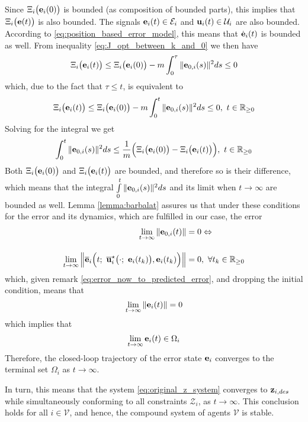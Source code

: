 Since $\Xi_i\big(\bm{\mathbf{e}}_i(0)\big)$
is bounded (as composition of bounded parts), this implies
that $\Xi_i\big(\bm{\mathbf{e}}(t)\big)$ is also bounded. The signals
$\bm{\mathbf{e}}_i(t) \in \mathcal{E}_i$ and $\bm{\mathbf{u}}_i(t) \in \mathcal{U}_i$
are also bounded. According to \eqref{eq:position_based_error_model}, this
means that $\dot{\bm{\mathbf{e}}}_i(t)$ is bounded as well. From inequality
\eqref{eq:J_opt_between_k_and_0} we then have
\begin{align}
  \Xi_i\big(\bm{\mathbf{e}}_i(t)\big) \leq \Xi_i\big(\bm{\mathbf{e}}_i(0)\big)
    -m \int_{0}^{\tau} \|\bm{\mathbf{e}}_{0,i}(s)\|^2 ds \leq 0
\end{align}
which, due to the fact that $\tau \leq t$, is equivalent to
\begin{align}
  \Xi_i\big(\bm{\mathbf{e}}_i(t)\big) \leq \Xi_i\big(\bm{\mathbf{e}}_i(0)\big) -m \int_{0}^{t} \|\bm{\mathbf{e}}_{0,i}(s)\|^2 ds \leq 0,\ t \in \mathbb{R}_{\geq 0}
\end{align}
Solving for the integral we get
\begin{align}
  \int_{0}^{t} \|\bm{\mathbf{e}}_{0,i}(s)\|^2 ds \leq
    \dfrac{1}{m}\Big(\Xi_i\big(\bm{\mathbf{e}}_i(0)\big) - \Xi_i\big(\bm{\mathbf{e}}_i(t)\big)\Big),\ t \in \mathbb{R}_{\geq 0}
\end{align}
Both $\Xi_i\big(\bm{\mathbf{e}}_i(0)\big)$ and $\Xi_i\big(\bm{\mathbf{e}}_i(t)\big)$
are bounded, and therefore so is their difference, which means that the
integral $\int\limits_{0}^{t} \|\bm{\mathbf{e}}_{0,i}(s)\|^2 ds$ and its limit when
$t \to \infty$ are bounded as well. Lemma \eqref{lemma:barbalat} assures us
that under these conditions for the error and its dynamics, which are
fulfilled in our case, the error
\begin{align}
  \lim\limits_{t \to \infty}\|\vect{e}_{0,i}(t)\| &= 0 \Leftrightarrow \\[2.5ex]
  \lim\limits_{t \to \infty}
  \Big\| \overline{\vect{e}}_i\Big(t;\ \overline{\vect{u}}_i^{\star}\big(\cdot;\ \vect{e}_i(t_k)\big), \vect{e}_i(t_k) \Big) \Big\| &= 0,\
\forall t_k \in \mathbb{R}_{\geq 0}
\end{align}
which, given remark \eqref{eq:error_now_to_predicted_error},
and dropping the initial condition, means that
$$\lim\limits_{t \to \infty}\|\bm{\mathbf{e}}_i(t)\| = 0$$
which implies that
$$\lim\limits_{t \to \infty}\bm{\mathbf{e}}_i(t) \in \Omega_i$$
Therefore, the closed-loop trajectory of the error state $\bm{\mathbf{e}}_i$ converges
to the terminal set $\Omega_i$ as $t \to \infty$.

In turn, this means that the system \eqref{eq:original_z_system} converges
to $\bm{\mathbf{z}}_{i,des}$ while simultaneously conforming to
all constraints $\mathcal{Z}_i$, as $t \to \infty$. This conclusion holds
for all $i \in \mathcal{V}$, and hence, the compound system of agents
$\mathcal{V}$ is stable.
\qedsymbol
